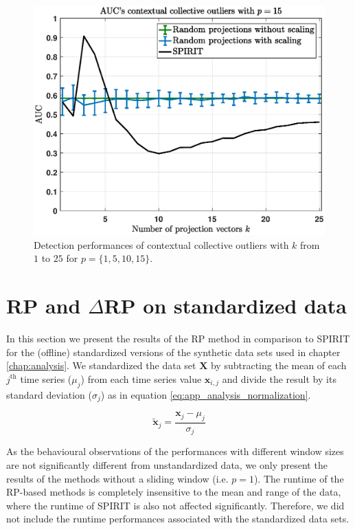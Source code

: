 \begin{figure}[h]
	\includegraphics[scale=0.36]{analysis/AUCs_collective3}
	\caption{Detection performances of contextual collective outliers with $k$ from $1$ to $25$ for $p=\{1,5,10,15\}$.}
	\label{fig:app_aucs_collective}
\end{figure}

\newpage
\section{RP and \texorpdfstring{$\Delta$RP}{deltaRP} on standardized data}
\label{sec:app_rp_standardized}
In this section we present the results of the RP method in comparison to SPIRIT for the (offline) standardized versions of the synthetic data sets used in chapter \ref{chap:analysis}. We standardized the data set $\mathbf{X}$ by subtracting the mean of each $j^{\text{th}}$ time series ($\mu_j$) from each time series value $\mathbf{x}_{i,j}$ and divide the result by its standard deviation ($\sigma_j$) as in equation \eqref{eq:app_analysis_normalization}.

\begin{equation}\label{eq:app_analysis_normalization}
	\tilde{\mathbf{x}}_j = \frac{\mathbf{x}_j - \mu_j}{\sigma_j}
\end{equation}

As the behavioural observations of the performances with different window sizes are not significantly different from unstandardized data, we only present the results of the methods without a sliding window (i.e. $p=1$). The runtime of the RP-based methods is completely insensitive to the mean and range of the data, where the runtime of SPIRIT is also not affected significantly. Therefore, we did not include the runtime performances associated with the standardized data sets. 


